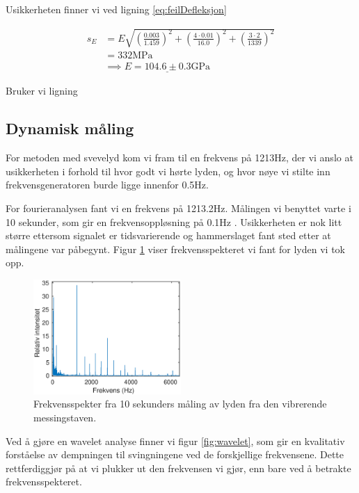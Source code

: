 \documentclass[a4paper,11pt, twocolumn]{article}
\begin{document}
Usikkerheten finner vi ved ligning \eqref{eq:feilDefleksjon}

\begin{align}
	s_E &= E\sqrt{\left(\frac{0.003}{1.459}\right)^2+\left(\frac{4\cdot0.01}{16.0}\right)^2+\left(\frac{3\cdot 2}{1339}\right)^2}\\
	&= 332\text{MPa}\\
	&\implies \underline{E = 104.6\pm0.3\text{GPa}}
\end{align}

Bruker vi ligning


\subsection{Dynamisk måling}
For metoden med svevelyd kom vi fram til en frekvens på 1213Hz, der vi anslo at usikkerheten i forhold til hvor godt vi hørte lyden, og hvor nøye vi stilte inn frekvensgeneratoren burde ligge innenfor 0.5Hz. 

For fourieranalysen fant vi en frekvens på 1213.2Hz. Målingen vi benyttet varte i 10 sekunder, som gir en frekvensoppløsning på 0.1Hz \cite{vistnes4}. Usikkerheten er nok litt større ettersom signalet er tidsvarierende og hammerslaget fant sted etter at målingene var påbegynt. Figur \ref{fig:frekvensspekter} viser frekvensspekteret vi fant for lyden vi tok opp.

\begin{figure}[!ht]
	\includegraphics[width = 0.5\textwidth]{matlab/frekvensspekter.eps}
	\caption{Frekvensspekter fra 10 sekunders måling av lyden fra den vibrerende messingstaven.}
	\label{fig:frekvensspekter}
\end{figure}

Ved å gjøre en wavelet analyse finner vi figur \ref{fig:wavelet}, som gir en kvalitativ forståelse av dempningen til svingningene ved de forskjellige frekvensene. Dette rettferdiggjør på at vi plukker ut den frekvensen vi gjør, enn bare ved å betrakte frekvensspekteret. 
\end{document}
